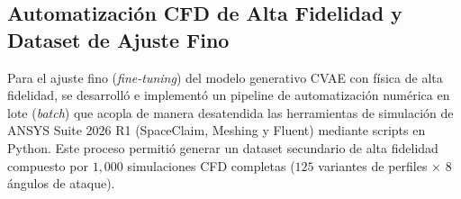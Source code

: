\begin{enumerate}
\subsection{Automatización CFD de Alta Fidelidad y Dataset de Ajuste Fino}
\label{subsec:automatizacion_cfd}

Para el ajuste fino (\textit{fine-tuning}) del modelo generativo CVAE con física de alta fidelidad, se desarrolló e implementó un pipeline de automatización numérica en lote (\textit{batch}) que acopla de manera desatendida las herramientas de simulación de ANSYS Suite 2026 R1 (SpaceClaim, Meshing y Fluent) mediante scripts en Python. Este proceso permitió generar un dataset secundario de alta fidelidad compuesto por $1{,}000$ simulaciones CFD completas ($125$ variantes de perfiles $\times$ $8$ ángulos de ataque).


\end{enumerate}

